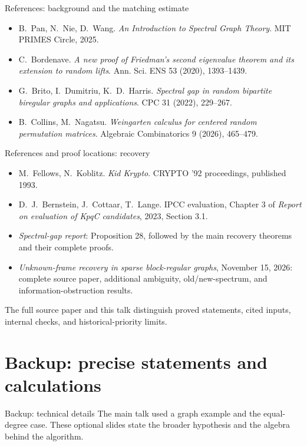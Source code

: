\documentclass[aspectratio=169,11pt]{beamer}
\begin{document}
\begin{frame}{References: background and the matching estimate}
\small
\begin{itemize}
\item B.~Pan, N.~Nie, D.~Wang.
\emph{An Introduction to Spectral Graph Theory}. MIT PRIMES Circle, 2025.
\item C.~Bordenave. \emph{A new proof of Friedman's second eigenvalue theorem
and its extension to random lifts}. Ann. Sci. ENS 53 (2020), 1393--1439.
\item G.~Brito, I.~Dumitriu, K.~D.~Harris.
\emph{Spectral gap in random bipartite biregular graphs and applications}.
CPC 31 (2022), 229--267.
\item B.~Collins, M.~Nagatsu. \emph{Weingarten calculus for centered random
permutation matrices}. Algebraic Combinatorics 9 (2026), 465--479.
\end{itemize}
\end{frame}

\begin{frame}{References and proof locations: recovery}
\small
\begin{itemize}
\item M.~Fellows, N.~Koblitz. \emph{Kid Krypto}. CRYPTO '92 proceedings,
published 1993.
\item D.~J.~Bernstein, J.~Cottaar, T.~Lange. IPCC evaluation, Chapter 3
of \emph{Report on evaluation of KpqC candidates}, 2023, Section 3.1.
\item \emph{Spectral-gap report}: Proposition 28, followed by the main recovery theorems and their complete proofs.
\item \emph{Unknown-frame recovery in sparse block-regular graphs},
November 15, 2026: complete source paper, additional ambiguity,
old/new-spectrum, and information-obstruction results.
\end{itemize}
The full source paper and this talk distinguish proved statements,
cited inputs, internal checks, and historical-priority limits.
\end{frame}

\appendix
\section{Backup: precise statements and calculations}
\begin{frame}{Backup: technical details}
The main talk used a graph example and the equal-degree case.
These optional slides state the broader hypothesis and the algebra behind the algorithm.
\end{frame}
\end{document}
